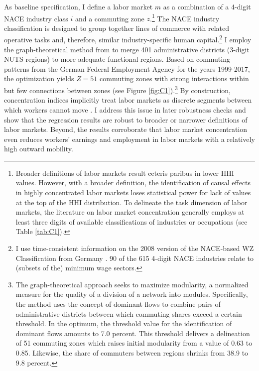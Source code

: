 \documentclass[11pt,oneside,reqno,xcolor=dvipsnames]{article} %
\begin{document}
As baseline specification, I define a labor market $m$ as a combination of a 4-digit NACE industry class $i$ and a commuting zone $z$.\footnote{Broader definitions of labor markets result ceteris paribus in lower HHI values. However, with a broader definition, the identification of causal effects in highly concentrated labor markets loses statistical power for lack of values at the top of the HHI distribution. To delineate the task dimension of labor markets, the literature on labor market concentration generally employs at least three digits of available classifications of industries or occupations (see Table \ref{tab:C1}).} The NACE industry classification is designed to group together lines of commerce with related operative tasks and, therefore, similar industry-specific human capital.\footnote{I use time-consistent information on the 2008 version of the NACE-based WZ Classification from Germany \citep{Destatis2008}. 90 of the 615 4-digit NACE industries relate to (subsets of the) minimum wage sectors.} I employ the graph-theoretical method from \citet{KroppSchwengler2016} to merge 401 administrative districts (3-digit NUTS regions) to more adequate functional regions. Based on commuting patterns from the German Federal Employment Agency for the years 1999-2017, the optimization yields $Z=51$ commuting zones with strong interactions within but few connections between zones (see Figure \ref{fig:C1}).\footnote{The graph-theoretical approach seeks to maximize modularity, a normalized measure for the quality of a division of a network into modules. Specifically, the method uses the concept of dominant flows to combine pairs of administrative districts between which commuting shares exceed a certain threshold. In the optimum, the threshold value for the identification of dominant flows amounts to 7.0 percent. This threshold delivers a delineation of 51 commuting zones which raises initial modularity from a value of 0.63 to 0.85. Likewise, the share of commuters between regions shrinks from 38.9 to 9.8 percent.} By construction, concentration indices implicitly treat labor markets as discrete segments between which workers cannot move \citep{Manning2021}. I address this issue in later robustness checks and show that the regression results are robust to broader or narrower definitions of labor markets. Beyond, the results corroborate that labor market concentration even reduces workers' earnings and employment in labor markets with a relatively high outward mobility.
\end{document}
